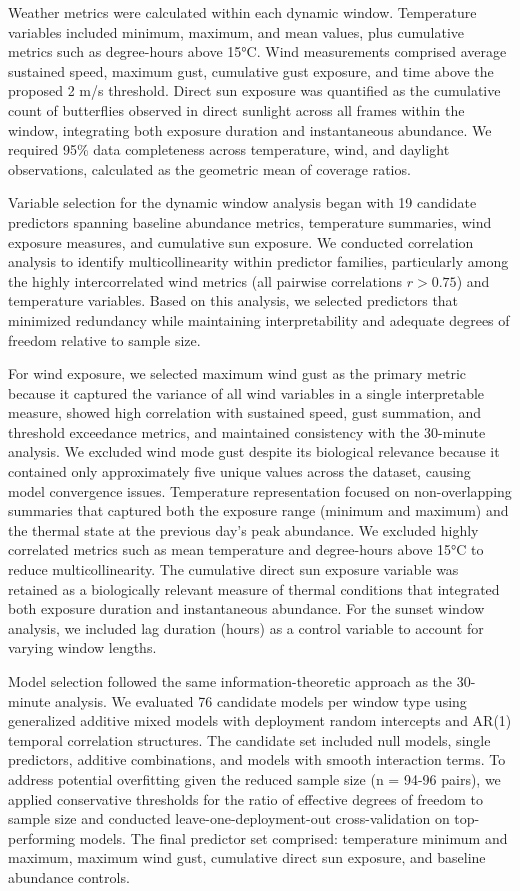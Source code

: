 Weather metrics were calculated within each dynamic window. Temperature variables included minimum, maximum, and mean values, plus cumulative metrics such as degree-hours above 15°C. Wind measurements comprised average sustained speed, maximum gust, cumulative gust exposure, and time above the proposed 2 m/s threshold. Direct sun exposure was quantified as the cumulative count of butterflies observed in direct sunlight across all frames within the window, integrating both exposure duration and instantaneous abundance. We required 95\% data completeness across temperature, wind, and daylight observations, calculated as the geometric mean of coverage ratios.

Variable selection for the dynamic window analysis began with 19 candidate predictors spanning baseline abundance metrics, temperature summaries, wind exposure measures, and cumulative sun exposure. We conducted correlation analysis to identify multicollinearity within predictor families, particularly among the highly intercorrelated wind metrics (all pairwise correlations $r > 0.75$) and temperature variables. Based on this analysis, we selected predictors that minimized redundancy while maintaining interpretability and adequate degrees of freedom relative to sample size.

For wind exposure, we selected maximum wind gust as the primary metric because it captured the variance of all wind variables in a single interpretable measure, showed high correlation with sustained speed, gust summation, and threshold exceedance metrics, and maintained consistency with the 30-minute analysis. We excluded wind mode gust despite its biological relevance because it contained only approximately five unique values across the dataset, causing model convergence issues. Temperature representation focused on non-overlapping summaries that captured both the exposure range (minimum and maximum) and the thermal state at the previous day's peak abundance. We excluded highly correlated metrics such as mean temperature and degree-hours above 15°C to reduce multicollinearity. The cumulative direct sun exposure variable was retained as a biologically relevant measure of thermal conditions that integrated both exposure duration and instantaneous abundance. For the sunset window analysis, we included lag duration (hours) as a control variable to account for varying window lengths.

Model selection followed the same information-theoretic approach as the 30-minute analysis. We evaluated 76 candidate models per window type using generalized additive mixed models with deployment random intercepts and AR(1) temporal correlation structures. The candidate set included null models, single predictors, additive combinations, and models with smooth interaction terms. To address potential overfitting given the reduced sample size (n = 94-96 pairs), we applied conservative thresholds for the ratio of effective degrees of freedom to sample size and conducted leave-one-deployment-out cross-validation on top-performing models. The final predictor set comprised: temperature minimum and maximum, maximum wind gust, cumulative direct sun exposure, and baseline abundance controls.

